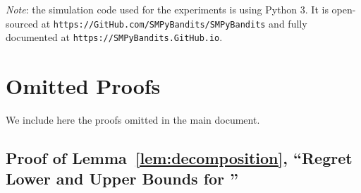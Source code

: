 \documentclass[12pt]{colt2018} %
\begin{document}





\vskip 0.2in
\hr{}
\emph{Note}:
    the simulation code used for the experiments is using Python 3.
    It is open-sourced at \verb|https://GitHub.com/SMPyBandits/SMPyBandits|
    and fully documented at \newline
    \verb|https://SMPyBandits.GitHub.io|.

\clearpage
\newpage

\appendix


\section{Omitted Proofs}\label{sec:missingproofs}

We include here the proofs omitted in the main document.


\subsection{Proof of Lemma~\ref{lem:decomposition}, ``Regret Lower and Upper Bounds for \DTr''}\label{sub:proof_decompositionDTr}
\end{document}
